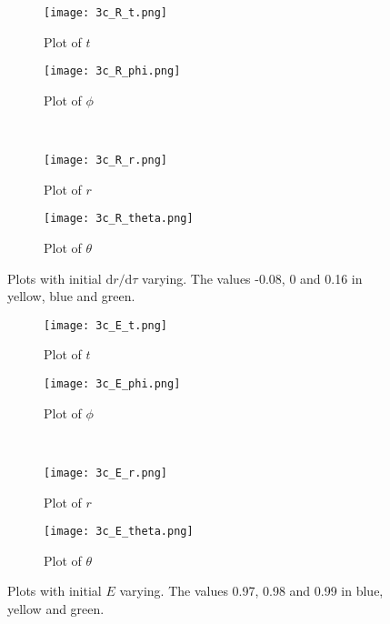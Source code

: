 \documentclass[12pt]{extarticle}
\begin{document}
\begin{figure}[h]
    \centering
    \begin{subfigure}[b]{0.4\textwidth}
        \texttt{[image: 3c\_R\_t.png]}
        \caption{Plot of $t$}
        \label{figure:8a}
    \end{subfigure}  
    \qquad
    \begin{subfigure}[b]{0.4\textwidth}
        \texttt{[image: 3c\_R\_phi.png]}
        \caption{Plot of $\phi$}
        \label{figure:8b}
    \end{subfigure} 
    \\ 
    \begin{subfigure}[b]{0.4\textwidth}
        \texttt{[image: 3c\_R\_r.png]}
        \caption{Plot of $r$}
        \label{figure:8c}
    \end{subfigure} 
    \qquad
    \begin{subfigure}[b]{0.4\textwidth}
        \texttt{[image: 3c\_R\_theta.png]}
        \caption{Plot of $\theta$}
        \label{figure:8d}
    \end{subfigure}
    \caption{Plots with initial $\mathrm{d}r/\mathrm{d}\tau$ varying. The values -0.08, 0 and 0.16 in yellow, blue and green.}
    \label{figure 8}
\end{figure}

\begin{figure}[h]
    \centering
    \begin{subfigure}[b]{0.4\textwidth}
        \texttt{[image: 3c\_E\_t.png]}
        \caption{Plot of $t$}
        \label{figure:9a}
    \end{subfigure}  
    \qquad
    \begin{subfigure}[b]{0.4\textwidth}
        \texttt{[image: 3c\_E\_phi.png]}
        \caption{Plot of $\phi$}
        \label{figure:9b}
    \end{subfigure} 
    \\ 
    \begin{subfigure}[b]{0.4\textwidth}
        \texttt{[image: 3c\_E\_r.png]}
        \caption{Plot of $r$}
        \label{figure:9c}
    \end{subfigure} 
    \qquad
    \begin{subfigure}[b]{0.4\textwidth}
        \texttt{[image: 3c\_E\_theta.png]}
        \caption{Plot of $\theta$}
        \label{figure:9d}
    \end{subfigure}
    \caption{Plots with initial $E$ varying. The values 0.97, 0.98 and 0.99 in blue, yellow and green.}
    \label{figure 9}
\end{figure}
\end{document}
